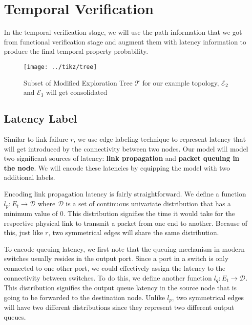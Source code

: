 \section{Temporal Verification} \label{sec:temp}
In the temporal verification stage, we will use the path information that we got from 
functional verification stage and augment them with latency information to 
produce the final temporal property probability.

\begin{figure}[h]
    \centering
    \texttt{[image: ../tikz/tree]}
    \caption{Subset of Modified Exploration Tree $\mathcal{T}$ for our example topology, 
        $\mathcal{E}_2$ and $\mathcal{E}_3$ will get consolidated}
    \label{fig:tree}
\end{figure}

\subsection{Latency Label}
Similar to link failure $r$, we use edge-labeling technique to represent latency that 
will get introduced by the connectivity between two nodes. 
Our model will model two significant sources of latency: \textbf{link propagation} 
and \textbf{packet queuing in the node}.
We will encode these latencies by equipping the model with two additional labels.

Encoding link propagation latency is fairly straightforward. 
We define a function $l_p: E_t \rightarrow \mathcal{D}$ where $\mathcal{D}$ is a set of 
continuous univariate distribution that has a minimum value of $0$.
This distribution signifies the time it would take for the respective physical link to transmit 
a packet from one end to another.
Because of this, just like $r$, two symmetrical edges will share the same distribution.

To encode queuing latency, we first note that the queuing mechanism in modern switches 
usually resides in the output port. %
Since a port in a switch is only connected to one other port, we could effectively 
assign the latency to the connectivity between switches.
To do this, we define another function $l_q: E_t \rightarrow \mathcal{D}$.
This distribution signifies the output queue latency in the source node that is 
going to be forwarded to the destination node.
Unlike $l_p$, two symmetrical edges will have two different distributions since they 
represent two different output queues.


